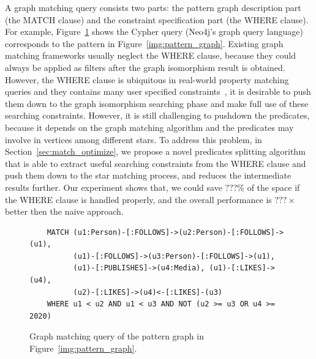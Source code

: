 A graph matching query consists two parts: the pattern graph description part (the MATCH clause) and the constraint specification part (the WHERE clause).
For example, Figure~\ref{img:cypher_query} shows the Cypher query (Neo4j's graph query language) corresponds to the pattern in Figure~\ref{img:pattern_graph}.
Existing graph matching frameworks usually neglect the WHERE clause,
because they could always be applied as filters after the graph isomorphism result is obtained.
However, the WHERE clause is ubiquitous in real-world property matching queries and they contains many user specified constraints~\cite{DBLP:journals/csur/AnglesABHRV17},
it is desirable to push them down to the graph isomorphism searching phase and make full use of these searching constraints.
However, it is still challenging to pushdown the predicates, because it depends on the graph matching algorithm and the predicates may involve in vertices among different stars.
To address this problem, in Section~\ref{sec:match_optimize}, we propose a novel predicates splitting algorithm that is able to extract useful searching constraints from the WHERE clause and push them down to the star matching process,
and reduces the intermediate results further.
Our experiment shows that, we could save $???\%$ of the space if the WHERE clause is handled properly,
and the overall performance is $???\times$ better then the naive approach.
\begin{figure}[ht]
  \begin{verbatim}
    MATCH (u1:Person)-[:FOLLOWS]->(u2:Person)-[:FOLLOWS]->(u1),
          (u1)-[:FOLLOWS]->(u3:Person)-[:FOLLOWS]->(u1),
          (u1)-[:PUBLISHES]->(u4:Media), (u1)-[:LIKES]->(u4),
          (u2)-[:LIKES]->(u4)<-[:LIKES]-(u3)
    WHERE u1 < u2 AND u1 < u3 AND NOT (u2 >= u3 OR u4 >= 2020)
  \end{verbatim}
  \caption{Graph matching query of the pattern graph in Figure~\ref{img:pattern_graph}.}\label{img:cypher_query}
\end{figure}
